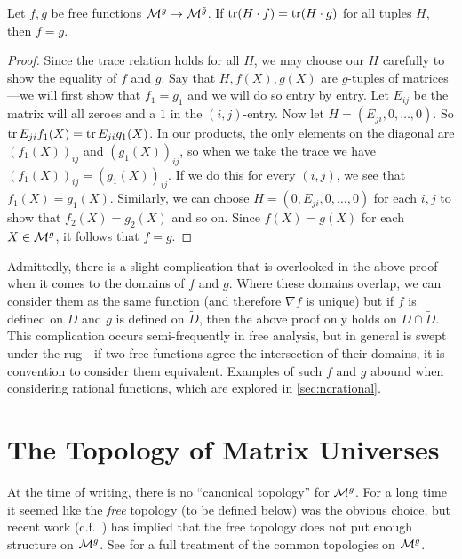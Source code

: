 \begin{theorem}%
\label{thm:trdual}
Let \(f,g\) be free functions \(\mathcal{M}^{g} \to \mathcal{M}^{\tilde{g}} \). If
\(\operatorname{tr} (H \cdot f) = \operatorname{tr} (H \cdot g)\) for all tuples \(H\), then \(f=g\).
\end{theorem}

\begin{proof}
  Since the trace relation holds for all $H$, we may choose our $H$ carefully to
  show the equality of $f$ and $g$. Say that $H,f(X),g(X)$ are $g$-tuples of
  matrices---we will first show that $f_1=g_1$ and we will do so entry by entry.
  Let $E_{ij}$ be the matrix will all zeroes and a \(1\) in the $(i,j)$-entry.  Now
  let $H= (E_{ji},0, \dots ,0)$. So $\operatorname{tr} E_{ji}f_1(X) = \operatorname{tr} E_{ji}g_1(X)$.
  In our products, the only elements on the diagonal are $(f_1(X))_{ij}$ and
  $(g_1(X))_{ij}$, so when we take the trace we have $(f_1(X))_{ij} =(g_1(X))_{ij}$. If we
  do this for every $(i,j)$, we see that $f_1(X)=g_1(X)$. Similarly, we can choose
  \(H = ( 0, E_{ji},0, \dots, 0)\) for each \(i,j\) to show that \(f_2(X)=g_2(X)\) and
  so on. Since \(f(X)=g(X)\) for each \(X \in \mathcal{M}^{g} \), it follows that \(f=g\).
\end{proof}

Admittedly, there is a slight complication that is overlooked in the above proof
when it comes to the domains of \(f\) and \(g\). Where these domains overlap, we
can consider them as the same function (and therefore \(\nabla f \) is unique)
but if \(f\) is defined on \(D\) and \(g\) is defined on \(\tilde{D}\), then the
above proof only holds on \(D \cap \tilde{D}\). This complication  occurs
semi-frequently in free analysis, but in general is swept under the rug---if two
free functions agree the intersection of their domains, it is convention to
consider them equivalent. Examples
of such \(f\) and \(g\) abound when considering rational functions, which are
explored in \cref{sec:ncrational}.

\section{The Topology of Matrix Universes }%
\label{sec:TopManUniv}

At the time of writing, there is no ``canonical topology'' for \(\mathcal{M}^g\). For a
long time it seemed like the \emph{free} topology (to be defined below) was the
obvious choice, but recent work (c.f.\ \cite{pascoeentire2019}) has implied that the free
topology does not put enough structure on \(\mathcal{M}^g\). See \cite{aglerAspects2016}
for a full treatment of the common topologies on \(\mathcal{M}^g\).

